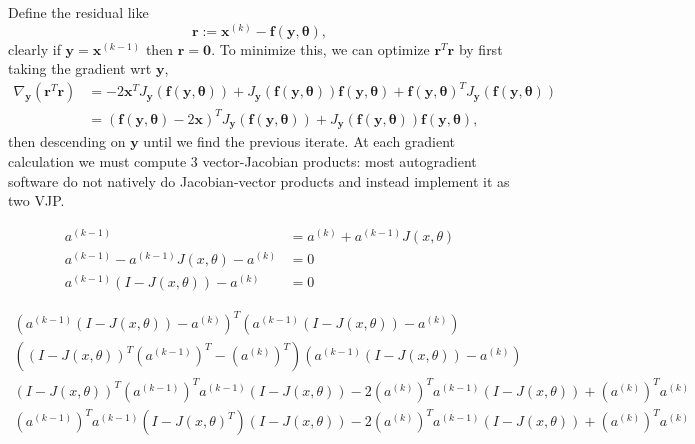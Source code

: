 \documentclass{article}
\renewcommand{\vec}[1]{\bm{{#1}}}
\newcommand{\gradfn}[2]{\nabla_{{#1}}\left({#2}\right)} %
\newcommand{\jac}[2]{J_{{#1}}\left({#2}\right)} %
\theoremstyle{definition}
\begin{document}
Define the residual like
\begin{equation}
  \vec{r} := \vec{x}^{(k)} - \vec{f}\left(\vec{y}, \vec{\theta}\right),
\end{equation}
clearly if $\vec{y}=\vec{x}^{(k-1)}$ then $\vec{r}=\vec{0}$.  To minimize this, we can optimize $\vec{r}^T\vec{r}$ by first taking the gradient wrt $\vec{y}$,
\begin{align}
  \gradfn{\vec{y}}{\vec{r}^T\vec{r}} &= -2\vec{x}^T\jac{\vec{y}}{\vec{f}\left(\vec{y}, \vec{\theta}\right)} + \jac{\vec{y}}{\vec{f}\left(\vec{y}, \vec{\theta}\right)}\vec{f}\left(\vec{y}, \vec{\theta}\right) + \vec{f}\left(\vec{y}, \vec{\theta}\right)^T\jac{\vec{y}}{\vec{f}\left(\vec{y}, \vec{\theta}\right)}\\
                                     &= \left(\vec{f}\left(\vec{y}, \vec{\theta}\right) -2\vec{x}\right)^T\jac{\vec{y}}{\vec{f}\left(\vec{y}, \vec{\theta}\right)} + \jac{\vec{y}}{\vec{f}\left(\vec{y}, \vec{\theta}\right)}\vec{f}\left(\vec{y}, \vec{\theta}\right),
\end{align}
then descending on $\vec{y}$ until we find the previous iterate.  At each gradient calculation we must compute 3 vector-Jacobian products: most autogradient software do not natively do Jacobian-vector products and instead implement it as two VJP.

\begin{align}
  a^{(k-1)} &= a^{(k)} + a^{(k-1)} J(x, \theta) \\
  a^{(k-1)} - a^{(k-1)} J(x, \theta) - a^{(k)} &= 0 \\
  a^{(k-1)} \left(I - J(x, \theta)\right) - a^{(k)} &= 0
\end{align}

\begin{align}
  \left(a^{(k-1)} \left(I - J(x, \theta)\right) - a^{(k)}\right)^T   \left(a^{(k-1)} \left(I - J(x, \theta)\right) - a^{(k)}\right) \\
  \left(\left(I - J(x, \theta)\right)^T \left(a^{(k-1)}\right)^T - \left(a^{(k)}\right)^T\right)   \left(a^{(k-1)} \left(I - J(x, \theta)\right) - a^{(k)}\right) \\
  \left(I - J(x, \theta)\right)^T \left(a^{(k-1)}\right)^T a^{(k-1)} \left(I - J(x, \theta)\right) - 2\left(a^{(k)}\right)^T a^{(k-1)} \left(I - J(x, \theta)\right) + \left(a^{(k)}\right)^Ta^{(k)} \\
  \left(a^{(k-1)}\right)^T a^{(k-1)} \left(I - J(x, \theta)^T\right) \left(I - J(x, \theta)\right) - 2\left(a^{(k)}\right)^T a^{(k-1)} \left(I - J(x, \theta)\right) + \left(a^{(k)}\right)^Ta^{(k)}
\end{align}
\end{document}
